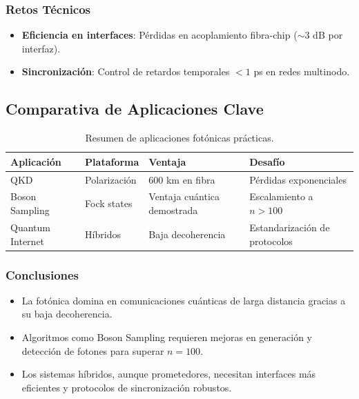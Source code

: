 \documentclass{article}
\begin{document}
\subsubsection*{Retos Técnicos}

\begin{itemize}
    \item \textbf{Eficiencia en interfaces}: Pérdidas en acoplamiento fibra-chip ($\sim 3$ dB por interfaz).
    \item \textbf{Sincronización}: Control de retardos temporales $<1$ ps en redes multinodo.
\end{itemize}

\subsection*{Comparativa de Aplicaciones Clave}

\begin{table}[h]
\centering
\small
\begin{tabular}{|l|l|l|l|}
\hline
\textbf{Aplicación} & \textbf{Plataforma} & \textbf{Ventaja} & \textbf{Desafío} \\
\hline
QKD & Polarización & 600 km en fibra & Pérdidas exponenciales \\
Boson Sampling & Fock states & Ventaja cuántica demostrada & Escalamiento a $n > 100$ \\
Quantum Internet & Híbridos & Baja decoherencia & Estandarización de protocolos \\
\hline
\end{tabular}
\caption{Resumen de aplicaciones fotónicas prácticas.}
\end{table}

\subsubsection*{Conclusiones}

\begin{itemize}
    \item La fotónica domina en comunicaciones cuánticas de larga distancia gracias a su baja decoherencia.
    \item Algoritmos como Boson Sampling requieren mejoras en generación y detección de fotones para superar $n=100$.
    \item Los sistemas híbridos, aunque prometedores, necesitan interfaces más eficientes y protocolos de sincronización robustos.
\end{itemize}
\end{document}
